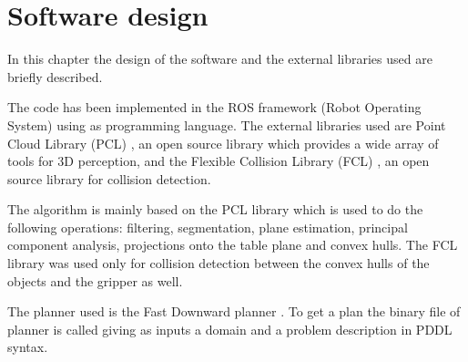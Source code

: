 \chapter{Software design}
\label{ch:software_design}
In this chapter the design of the software and the  external libraries used are briefly described. 

The code has been implemented in the ROS framework (Robot Operating System) \citep{ROS} using  as programming language. 
The external libraries used are Point Cloud Library (PCL) \citep{PCL}, an open source library which provides a wide array of tools for 3D perception, and the Flexible Collision Library (FCL) \citep{pan2012fcl}, an open source  library for collision detection.

The algorithm is mainly based on the PCL library which is used to do the following operations: filtering, segmentation, plane estimation, principal component analysis, projections onto the table plane and convex hulls.
The FCL library was used only for collision detection between the convex hulls of the objects and the gripper as well. 

The planner used is the Fast Downward planner \citep{helmert2006fast}. To get a plan the binary file of planner is called giving as inputs a domain and a problem description in PDDL syntax.

 

